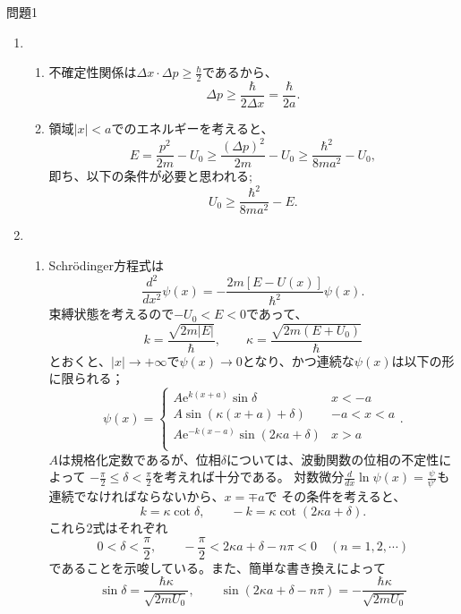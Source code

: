 \documentclass[fleqn]{jbook}
\begin{document}
\begin{answer}{問題1}{}
\begin{enumerate}
  \item 
	\begin{enumerate}
  	  \item 不確定性関係は$\Delta x\cdot \Delta p\ge \frac{\hbar}{2}$であるから、
  	  	\[
  	  		\Delta p \ge \frac{\hbar}{2\Delta x}=\frac{\hbar}{2a}.
  	  	\]
  	  \item 領域$|x|<a$でのエネルギーを考えると、
  	  	\[
  	  		E=\frac{p^2}{2m}-U_0
  	  		 \ge \frac{(\Delta p)^2}{2m}-U_0
  	  		 \ge \frac{\hbar^2}{8ma^2}-U_0,
  	  	\]
  	  	即ち、以下の条件が必要と思われる;
  	  	\[
  	  		U_0 \ge \frac{\hbar^2}{8ma^2}-E.
  	  	\]
	\end{enumerate}
  \item 
  	\begin{enumerate}
  	  \item Schr\"odinger方程式は
  	  	\[
  			\frac{d^2}{dx^2}\psi(x)=-\frac{2m\left[E-U(x)\right]}{\hbar^2}\psi(x).
  	  	\]
  	  	束縛状態を考えるので$-U_0<E<0$であって、
  	  	\[
  	  		k=\frac{\sqrt{2m|E|}}{\hbar},
  	  		\qquad
  	  		\kappa = \frac{\sqrt{2m(E+U_0)}}{\hbar}
  	  	\]
  	  	とおくと、$|x|\to +\infty$で$\psi(x)\to 0$となり、かつ連続な$\psi(x)$は以下の形に限られる；
  	  	\[
  	  		\psi(x)=\left\{
  					\begin{array}{cc}
     						A \mathrm e^{k(x+a)} \sin \delta                & x<-a   \\
						A \sin \left(\kappa (x+a)+\delta\right)         & -a<x<a \\
						A \mathrm e^{-k(x-a)} \sin (2\kappa a+\delta)   & x>a    \\
  					\end{array}
				\right..
  	  	\]
  	  	$A$は規格化定数であるが、位相$\delta$については、波動関数の位相の不定性によって
  	  	$-\frac{\pi}{2} \le \delta < \frac{\pi}{2}$を考えれば十分である。
  	  	対数微分$\frac{d}{dx}\ln\psi(x)=\frac{\psi}{\psi'}$も連続でなければならないから、$x=\mp a$で
  	  	その条件を考えると、
  	  	\[
  	  		k = \kappa \cot \delta,  
  	  		\qquad
  	  		-k = \kappa \cot (2\kappa a +\delta).
  	  	\]
  	  	これら2式はそれぞれ
  	  	\[
  	  		0 < \delta < \frac{\pi}{2},
  	  		\qquad
  	  		-\frac{\pi}{2} < 2\kappa a + \delta -n\pi <0 \quad (n=1,2,\cdots)
  	  	\]
  	  	であることを示唆している。また、簡単な書き換えによって
  	  	\[
  	  		\sin \delta = \frac{\hbar\kappa}{\sqrt{2mU_0}},
  	  		\qquad
  	  		\sin (2\kappa a + \delta - n\pi) = -\frac{\hbar\kappa}{\sqrt{2mU_0}}
\]
\end{enumerate}
\end{enumerate}
\end{answer}
\end{document}
